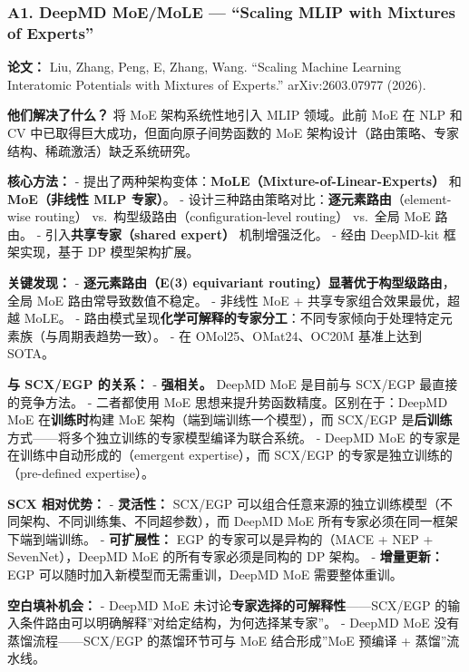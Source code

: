\documentclass[
  12pt,
]{ctexart}
\begin{document}
\subsubsection{A1. DeepMD MoE/MoLE --- ``Scaling MLIP with Mixtures of
Experts''}\label{a1.-deepmd-moemole-scaling-mlip-with-mixtures-of-experts}

\textbf{论文：} Liu, Zhang, Peng, E, Zhang, Wang. ``Scaling Machine
Learning Interatomic Potentials with Mixtures of Experts.''
arXiv:2603.07977 (2026).

\textbf{他们解决了什么？} 将 MoE 架构系统性地引入 MLIP 领域。此前 MoE 在
NLP 和 CV 中已取得巨大成功，但面向原子间势函数的 MoE
架构设计（路由策略、专家结构、稀疏激活）缺乏系统研究。

\textbf{核心方法：} -
提出了两种架构变体：\textbf{MoLE（Mixture-of-Linear-Experts）} 和
\textbf{MoE（非线性 MLP 专家）}。 -
设计三种路由策略对比：\textbf{逐元素路由}（element-wise routing）
vs.~构型级路由（configuration-level routing） vs.~全局 MoE 路由。 -
引入\textbf{共享专家（shared expert）} 机制增强泛化。 - 经由 DeepMD-kit
框架实现，基于 DP 模型架构扩展。

\textbf{关键发现：} - \textbf{逐元素路由（E(3) equivariant
routing）显著优于构型级路由}，全局 MoE 路由常导致数值不稳定。 - 非线性
MoE + 共享专家组合效果最优，超越 MoLE。 -
路由模式呈现\textbf{化学可解释的专家分工}：不同专家倾向于处理特定元素族（与周期表趋势一致）。
- 在 OMol25、OMat24、OC20M 基准上达到 SOTA。

\textbf{与 SCX/EGP 的关系：} - \textbf{强相关。} DeepMD MoE 是目前与
SCX/EGP 最直接的竞争方法。 - 二者都使用 MoE
思想来提升势函数精度。区别在于：DeepMD MoE 在\textbf{训练时}构建 MoE
架构（端到端训练一个模型），而 SCX/EGP
是\textbf{后训练}方式------将多个独立训练的专家模型编译为联合系统。 -
DeepMD MoE 的专家是在训练中自动形成的（emergent expertise），而 SCX/EGP
的专家是独立训练的（pre-defined expertise）。

\textbf{SCX 相对优势：} - \textbf{灵活性：} SCX/EGP
可以组合任意来源的独立训练模型（不同架构、不同训练集、不同超参数），而
DeepMD MoE 所有专家必须在同一框架下端到端训练。 - \textbf{可扩展性：}
EGP 的专家可以是异构的（MACE + NEP + SevenNet），DeepMD MoE
的所有专家必须是同构的 DP 架构。 - \textbf{增量更新：} EGP
可以随时加入新模型而无需重训，DeepMD MoE 需要整体重训。

\textbf{空白填补机会：} - DeepMD MoE
未讨论\textbf{专家选择的可解释性}------SCX/EGP
的输入条件路由可以明确解释''对给定结构，为何选择某专家''。 - DeepMD MoE
没有蒸馏流程------SCX/EGP 的蒸馏环节可与 MoE 结合形成''MoE 预编译 +
蒸馏''流水线。
\end{document}
